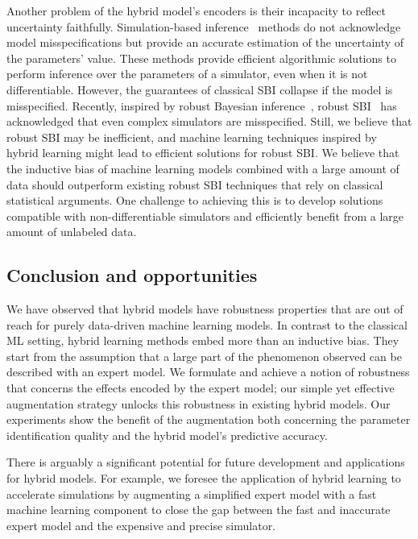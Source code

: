 Another problem of the hybrid model's encoders is their incapacity to reflect uncertainty faithfully. Simulation-based inference~\citep[][SBI]{cranmer2020frontier} methods do not acknowledge model misspecifications but provide an accurate estimation of the uncertainty of the parameters' value. These methods provide efficient algorithmic solutions to perform inference over the parameters of a simulator, even when it is not differentiable. However, the guarantees of classical SBI collapse if the model is misspecified. Recently, inspired by robust Bayesian inference~\citep{cherief2020mmd,knoblauch2019generalized}, robust SBI~\citep{dellaporta2022robust} has acknowledged that even complex simulators are misspecified. Still, we believe that robust SBI may be inefficient, and machine learning techniques inspired by hybrid learning might lead to efficient solutions for robust SBI. We believe that the inductive bias of machine learning models combined with a large amount of data should outperform existing robust SBI techniques that rely on classical statistical arguments. One challenge to achieving this is to develop solutions compatible with non-differentiable simulators and efficiently benefit from a large amount of unlabeled data.

\subsection{Conclusion and opportunities}
We have observed that hybrid models have robustness properties that are out of reach for purely data-driven machine learning models. In contrast to the classical ML setting, hybrid learning methods embed more than an inductive bias. They start from the assumption that a large part of the phenomenon observed can be described with an expert model. We formulate and achieve a notion of robustness that concerns the effects encoded by the expert model; our simple yet effective augmentation strategy unlocks this robustness in existing hybrid models. Our experiments show the benefit of the augmentation both concerning the parameter identification quality and the hybrid model's predictive accuracy.

There is arguably a significant potential for future development and applications for hybrid models. For example, we foresee the application of hybrid learning to accelerate simulations by augmenting a simplified expert model with a fast machine learning component to close the gap between the fast and inaccurate expert model and the expensive and precise simulator.

